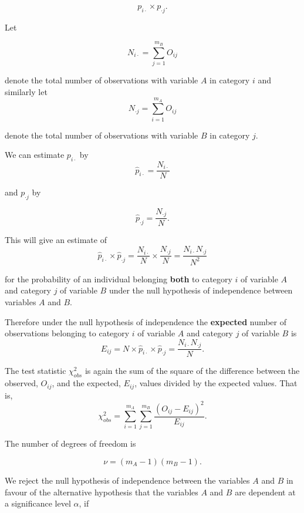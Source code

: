 \documentclass[
]{book}
\begin{document}
\[ p_{i \cdot} \times p_{\cdot j}. \]

Let

\[N_{i \cdot} = \sum_{j=1}^{m_B} O_{ij}\]

denote the total number of observations with variable \(A\) in category \(i\) and similarly let\\

\[N_{\cdot j} = \sum_{i=1}^{m_A} O_{ij}\]

denote the total number of observations with variable \(B\) in category \(j\).

We can estimate \(p_{i \cdot}\) by\\

\[ \hat{p}_{i \cdot} = \frac{N_{i \cdot}}{N} \]

and \(p_{\cdot j}\) by

\[ \hat{p}_{\cdot j} = \frac{N_{\cdot j}}{N}. \]

This will give an estimate of\\

\[ \hat{p}_{i \cdot} \times \hat{p}_{\cdot j} = \frac{N_{i \cdot}}{N} \times  \frac{N_{\cdot j}}{N} = \frac{N_{i \cdot} N_{\cdot j}}{N^2} \]

for the probability of an individual belonging {\textbf{both}} to category \(i\) of variable \(A\) and category \(j\) of variable \(B\) under the null hypothesis of independence between variables \(A\) and \(B\).

Therefore under the null hypothesis of independence the {\textbf{expected}} number of observations belonging to category \(i\) of variable \(A\) and category \(j\) of variable \(B\) is\\

\[ E_{ij} = N \times\hat{p}_{i \cdot} \times \hat{p}_{\cdot j} = \frac{N_{i \cdot} N_{\cdot j}}{N}.  \]

The test statistic \(\chi_{obs}^2\) is again the sum of the square of the difference between the observed, \(O_{ij}\), and the expected, \(E_{ij}\), values divided by the expected values. That is,\\

\[ \chi^2_{obs} = \sum_{i=1}^{m_A} \sum_{j=1}^{m_B} \frac{(O_{ij} - E_{ij})^2 }{E_{ij}}. \]

The number of degrees of freedom is

\[ \nu = (m_A -1) (m_B-1). \]

We reject the null hypothesis of independence between the variables \(A\) and \(B\) in favour of the alternative hypothesis that the variables \(A\) and \(B\) are dependent at a significance level \(\alpha\), if\\
\end{document}
